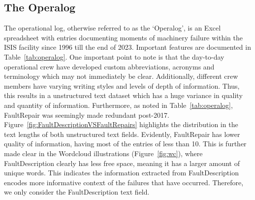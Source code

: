 \documentclass[10pt,oneside]{report}
\begin{document}
\subsection{The Operalog}
The operational log, otherwise referred to as the `Operalog', is an Excel spreadsheet with entries documenting moments of machinery failure within the ISIS facility since 1996 till the end of 2023. Important features are documented in Table~\ref{tab:operalog}. One important point to note is that the day-to-day operational crew have developed custom abbreviations, acronyms and terminology which may not immediately be clear. Additionally, different crew members have varying writing styles and levels of depth of information. Thus, this results in a unstructured text dataset which has a huge variance in quality and quantity of information. Furthermore, as noted in Table~\ref{tab:operalog}, FaultRepair was seemingly made redundant post-2017. Figure~\ref{fig:FaultDescriptionVSFaultRepairs} highlights the distribution in the text lengths of both unstructured text fields. Evidently, FaultRepair has lower quality of information, having most of the entries of less than 10. This is further made clear in the Wordcloud illustrations (Figure~\ref{fig:wc}), where FaultDescription clearly has less free space, meaning it has a larger amount of unique words. This indicates the information extracted from FaultDescription encodes more informative context of the failures that have occurred. Therefore, we only consider the FaultDescription text field.
\end{document}
